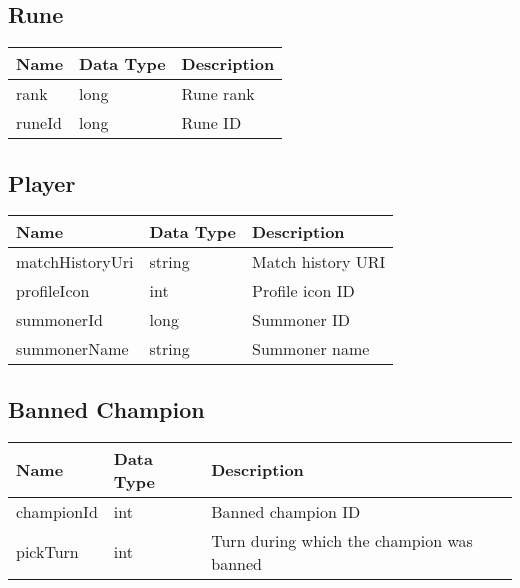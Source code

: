 \FloatBarrier
\subsection{Rune}
\begin{table}[!h]
\footnotesize
\centering
\begin{tabular}{llp{5cm}}
\textbf{Name} & \textbf{Data Type} & \textbf{Description} \\ \hline
rank          & long               & Rune rank            \\ \hline
runeId        & long               & Rune ID              \\ \hline
\end{tabular}
\end{table}


\FloatBarrier
\subsection{Player}
\begin{table}[!h]
\footnotesize
\centering
\begin{tabular}{llp{5cm}}
\textbf{Name}   & \textbf{Data Type} & \textbf{Description} \\ \hline
matchHistoryUri & string             & Match history URI    \\ \hline
profileIcon     & int                & Profile icon ID      \\ \hline
summonerId      & long               & Summoner ID          \\ \hline
summonerName    & string             & Summoner name        \\ \hline
\end{tabular}
\end{table}


\FloatBarrier
\subsection{Banned Champion}
\begin{table}[!h]
\footnotesize
\centering
\begin{tabular}{llp{5cm}}
\textbf{Name} & \textbf{Data Type} & \textbf{Description}                      \\ \hline
championId    & int                & Banned champion ID                        \\ \hline
pickTurn      & int                & Turn during which the champion was banned \\ \hline
\end{tabular}
\end{table}


